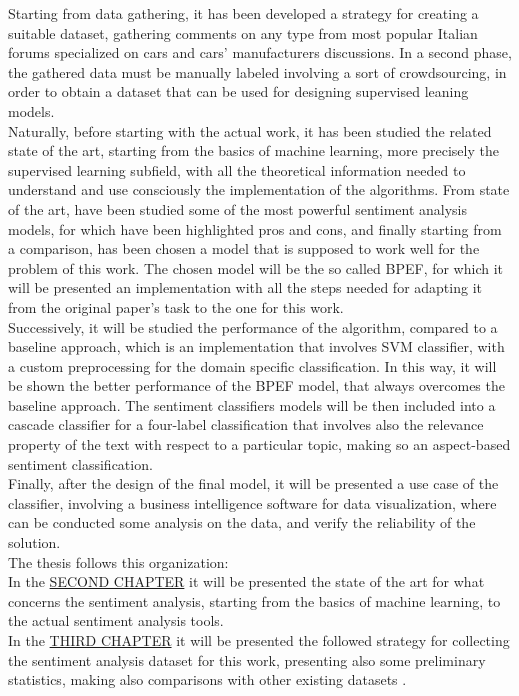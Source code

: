 Starting from data gathering, it has been developed a strategy for creating a suitable dataset, gathering comments on any type from most popular Italian forums specialized on cars and cars' manufacturers discussions. In a second phase, the gathered data must be manually labeled involving a sort of crowdsourcing, in order to obtain a dataset that can be used for designing supervised leaning models.\\
Naturally, before starting with the actual work, it has been studied the related state of the art, starting from the basics of machine learning, more precisely the supervised learning subfield, with all the theoretical information needed to understand and use consciously the implementation of the algorithms. From state of the art, have been studied some of the most powerful sentiment analysis models, for which have been highlighted pros and cons, and finally starting from a comparison, has been chosen a model that is supposed to work well for the problem of this work. The chosen model will be the so called \ac{BPEF}, for which it will be presented an implementation with all the steps needed for adapting it from the original paper's task to the one for this work.\\
Successively, it will be studied the performance of the algorithm, compared to a baseline approach, which is an implementation that involves \acl{SVM} classifier, with a custom preprocessing for the domain specific classification. In this way, it will be shown the better performance of the \ac{BPEF} model, that always overcomes the baseline approach. The sentiment classifiers models will be then included into a cascade classifier for a four-label classification that involves also the relevance property of the text with respect to a particular topic, making so an aspect-based sentiment classification.\\
Finally, after the design of the final model, it will be presented a use case of the classifier, involving a business intelligence software for data visualization, where can be conducted some analysis on the data, and verify the reliability of the solution.\\
The thesis follows this organization:\\
In the \hyperref[state-of-the-art]{\textcolor[RGB]{35,103,148}{SECOND CHAPTER}} it will be presented the state of the art for what concerns the sentiment analysis, starting from the basics of machine learning, to the actual sentiment analysis tools.\\
In the \hyperref[dataset]{\textcolor[RGB]{35,103,148}{THIRD CHAPTER}} it will be presented the followed strategy for collecting the sentiment analysis dataset for this work, presenting also some preliminary statistics, making also comparisons with other existing datasets .\\
